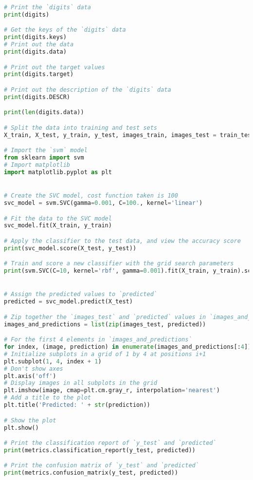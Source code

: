 \documentclass[Proceedings]{ascelike}
\begin{document}
{\begin{lstlisting}[language=Python]
# Print the `digits` data
print(digits)

# Get the keys of the `digits` data
print(digits.keys)
# Print out the data
print(digits.data)

# Print out the target values
print(digits.target)

# Print out the description of the `digits` data
print(digits.DESCR)

print(len(digits.data))

# Split the data into training and test sets
X_train, X_test, y_train, y_test, images_train, images_test = train_test_split(digits.data, digits.target, digits.images, test_size=0.25, random_state=42)

# Import the `svm` model
from sklearn import svm
# Import matplotlib
import matplotlib.pyplot as plt


# Create the SVC model, cost function taken is 100
svc_model = svm.SVC(gamma=0.001, C=100., kernel='linear')

# Fit the data to the SVC model
svc_model.fit(X_train, y_train)

# Apply the classifier to the test data, and view the accuracy score
print(svc_model.score(X_test, y_test))

# Train and score a new classifier with the grid search parameters
print(svm.SVC(C=10, kernel='rbf', gamma=0.001).fit(X_train, y_train).score(X_test, y_test))


# Assign the predicted values to `predicted`
predicted = svc_model.predict(X_test)

# Zip together the `images_test` and `predicted` values in `images_and_predictions`
images_and_predictions = list(zip(images_test, predicted))

# For the first 4 elements in `images_and_predictions`
for index, (image, prediction) in enumerate(images_and_predictions[:4]):
# Initialize subplots in a grid of 1 by 4 at positions i+1
plt.subplot(1, 4, index + 1)
# Don't show axes
plt.axis('off')
# Display images in all subplots in the grid
plt.imshow(image, cmap=plt.cm.gray_r, interpolation='nearest')
# Add a title to the plot
plt.title('Predicted: ' + str(prediction))

# Show the plot
plt.show()

# Print the classification report of `y_test` and `predicted`
print(metrics.classification_report(y_test, predicted))

# Print the confusion matrix of `y_test` and `predicted`
print(metrics.confusion_matrix(y_test, predicted))


\end{lstlisting}}
\end{document}
